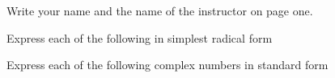 \documentclass[11pt]{exam}
\begin{document}
\begin{questions}


\question[5] Write your name and the name of the instructor on page one. 

\addpoints
\question Express each of the following in simplest radical form

\newpage

\addpoints
\question Express each of the following complex numbers in standard form


\newpage



\end{questions}
\end{document}

